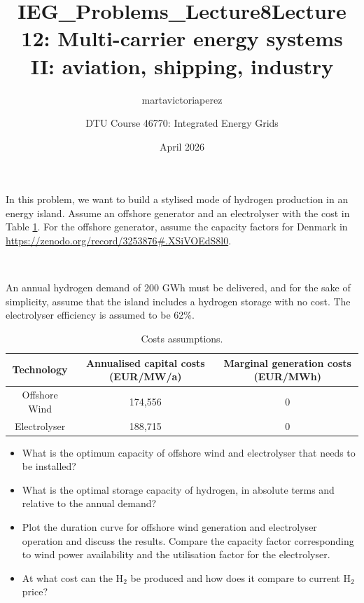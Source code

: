 \documentclass[10pt]{article}
\title{IEG_Problems_Lecture8}
\author{martavictoriaperez }
\date{April 2026}
\newenvironment{problem}[2][Problem]{\begin{trivlist}
\item[\hskip \labelsep {\bfseries #1}\hskip \labelsep {\bfseries #2.}]}{\end{trivlist}}
\begin{document}
 
\title{\textbf{Lecture 12: Multi-carrier energy systems II: aviation, shipping, industry}}
\author{DTU Course 46770: Integrated Energy Grids }
\maketitle

\begin{problem}{12.1}

In this problem, we want to build a stylised mode of hydrogen production in an energy island. Assume an offshore generator and an electrolyser with the cost in Table \ref{tab:my_label}. For the offshore generator, assume the capacity factors for Denmark in \url{https://zenodo.org/record/3253876#.XSiVOEdS8l0}.

\

An annual hydrogen demand of 200 GWh must be delivered, and for the sake of simplicity, assume that the island includes a hydrogen storage with no cost. The electrolyser efficiency is assumed to be 62\%.



\begin{table}[h]
    \centering
    \begin{tabular}{ccc}
    \hline
        Technology & Annualised capital costs (EUR/MW/a) & Marginal generation costs (EUR/MWh) \\
    \hline
    Offshore Wind &  174,556 & 0 \\
         Electrolyser & 188,715 & 0 \\
    \hline
    \end{tabular}
    \caption{Costs assumptions.}
    \label{tab:my_label}
\end{table}

\begin{itemize}
\item[a)] What is the optimum capacity of offshore wind and electrolyser that needs to be installed?

\item[b)] What is the optimal storage capacity of hydrogen, in absolute terms and relative to the annual demand?

\item[c)] Plot the duration curve for offshore wind generation and electrolyser operation and discuss the results. Compare the capacity factor corresponding to wind power availability and the utilisation factor for the electrolyser. 

\item[d)] At what cost can the H$_2$ be produced and how does it compare to current H$_2$ price?

\end{itemize}


\end{problem}
\end{document}
